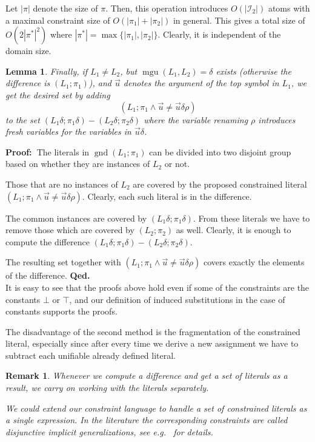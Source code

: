 \documentclass[a4paper]{article}
\newcommand{\mGnd}{\operatorname{gnd}} \newcommand{\mLVar}{\operatorname{lvar}} \newcommand{\mRVar}{\operatorname{rvar}} \newcommand{\mDmn}{\operatorname{dom}} \newcommand{\mRng}{\operatorname{rng}} \newcommand{\mMGU}{\operatorname{mgu}} \newcommand{\mDef}{\operatorname{def}} \newcommand{\mDomain}{\mathcal{D}} \newcommand{\mVar}{\operatorname{var}}
\newcommand{\startproof}{{\bf Proof:~}}
\newcommand{\finishproof}{{\bf Qed.}}
\newtheorem{remark}[defi]{Remark}
\newtheorem{lemm}[defi]{Lemma}
\begin{document}
\indent
Let $|\pi|$ denote the size of $\pi$. 
Then, this operation introduces $O(|\mathcal{I}_2|)$ atoms with a maximal constraint size of $O(|\pi_1| + |\pi_2|)$ in general. 
This gives a total size of $O(2|\pi^*|^2)$ where $|\pi^*| = \operatorname{max}\{|\pi_1|, |\pi_2|\}$.
Clearly, it is independent of the domain size.

\begin{lemm}
Finally, if $L_1 \ne L_2$, but $\mMGU(L_1, L_2) = \delta$ exists (otherwise the difference is $(L_1; \pi_1)$), and $\vec{u}$ denotes the argument of the top symbol in $L_1$, we get the desired set by adding 
\[(L_1; \pi_1 \land \vec{u} \ne \vec{u}\delta\rho)\]
to the set $(L_1\delta; \pi_1\delta) - (L_2\delta; \pi_2\delta)$ 
where the variable renaming $\rho$ introduces fresh variables for 
the variables in $\vec{u}\delta$.
\end{lemm}

\startproof The literals in $\mGnd(L_1; \pi_1)$ can be divided into two disjoint group based on whether they are instances of $L_2$ or not.

Those that are no instances of $L_2$ are covered by the proposed constrained literal $(L_1; \pi_1 \land \vec{u} \ne \vec{u}\delta\rho)$. Clearly, 
each such literal is in the difference.

The common instances are covered by $(L_1\delta; \pi_1\delta)$. From these literals we have to remove those which are covered by $(L_2; \pi_2)$ as well. 
Clearly, it is enough to compute the difference $(L_1\delta; \pi_1\delta) - (L_2\delta; \pi_2\delta)$.

The resulting set together with $(L_1; \pi_1 \land \vec{u} \ne \vec{u}\delta\rho)$ covers exactly the elements of the difference.
\finishproof\\[6 pt]
\indent
It is easy to see that the proofs above hold even if some of the constraints are the constants $\bot$ or $\top$, 
and our definition of induced substitutions in the case of constants supports the proofs.

The disadvantage of the second method is the fragmentation of the constrained literal, 
especially since after every time we derive a new assignment we have to subtract each unifiable already defined literal.

\begin{remark}
Whenever we compute a difference and get a set of literals as a result, we carry on working with the literals separately. 

We could extend our constraint language to handle a set of constrained literals as a single expression. 
In the literature the corresponding constraints are called \emph{disjunctive implicit generalizations}, see e.g.\
\cite{Pichler03} for details.
\end{remark}
\end{document}
